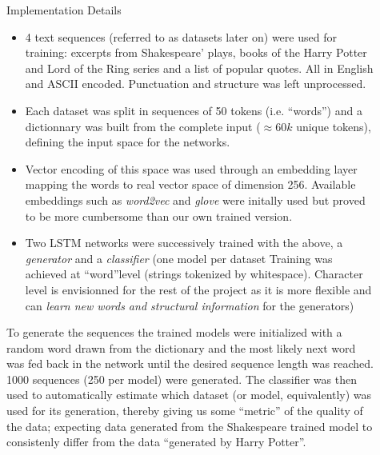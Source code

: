 \documentclass[final]{beamer}
\newlength{\sepwidth}
\newlength{\colwidth}
\newcommand{\separatorcolumn}{\begin{column}{\sepwidth}\end{column}}
\begin{document}
\begin{frame}[t]
\begin{columns}[t]
\begin{column}{\colwidth}
\begin{block}{Implementation Details}
    \begin{itemize}
        \item 4 text sequences (referred to as datasets later on) were used for
            training: excerpts from Shakespeare' plays, books of the Harry
            Potter and Lord of the Ring series and a list of popular quotes.
            All in English and ASCII encoded. Punctuation and structure was
            left unprocessed.
        \item Each dataset was split in sequences of 50 tokens (i.e. ``words'') and a
            dictionnary was built from the complete input ($\approx 60k$ unique tokens),
            defining the input space for the networks.
        \item Vector encoding of this space was used through an embedding layer 
            mapping the words to real vector space of dimension 256. Available
            embeddings such as \textit{word2vec} and \textit{glove} were 
            initally used but proved to be more cumbersome than our own 
            trained version.
        \item Two LSTM networks were successively trained with the above, a
            \textit{generator} and a \textit{classifier} (one model per dataset
             Training was achieved at ``word''level (strings tokenized by
             whitespace).  Character level is envisionned for the rest of the
             project as it is more flexible and can \textit{learn new words and
             structural information}\cite{gravesGenerating} for the generators)
    \end{itemize}
To generate the sequences the trained models were initialized with a random word
drawn from the dictionary and the most likely next word was fed back in the network
until the desired sequence length was reached. 1000 sequences (250 per model) were
generated. The classifier was then used to automatically estimate which
dataset (or model, equivalently) was used for its generation, thereby giving us
some ``metric'' of the quality of the data; expecting data generated from the
Shakespeare trained model to consistenly differ from the data ``generated by
Harry Potter''.
\end{block}
\end{column}

\separatorcolumn

\begin{column}{\colwidth}


\end{column}
\end{columns}
\end{frame}
\end{document}

